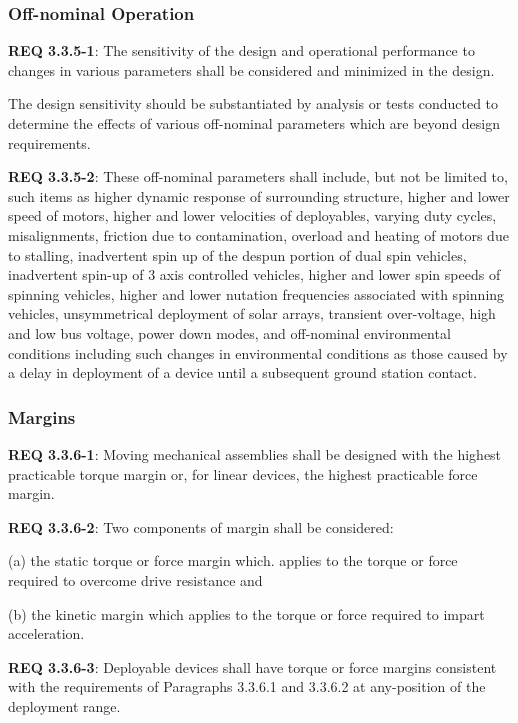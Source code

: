 \documentclass[12pt]{article}
\begin{document}
\subsubsection{Off-nominal Operation} %
\noindent \textbf{REQ 3.3.5-1}: The sensitivity of the design and operational performance to changes in various parameters shall be considered and minimized in the design. 

The design sensitivity should be substantiated by analysis or tests conducted to determine the effects of various off-nominal parameters which are beyond design requirements. 

\noindent \textbf{REQ 3.3.5-2}: These off-nominal parameters shall include, but not be limited to, such items as higher dynamic response of surrounding structure, higher and lower speed of motors, higher and lower velocities of deployables, varying duty cycles, misalignments, friction due to contamination, overload and heating of motors due to stalling, inadvertent spin up of the despun portion of dual spin vehicles, inadvertent spin-up of 3 axis controlled vehicles, higher and lower spin speeds of spinning vehicles, higher and lower nutation frequencies associated with spinning vehicles, unsymmetrical deployment of solar arrays, transient over-voltage, high and low bus voltage, power down modes, and off-nominal environmental conditions including such changes in environmental conditions as those caused by a delay in deployment of a device until a subsequent ground station contact.


\subsubsection{Margins} %
\noindent \textbf{REQ 3.3.6-1}: Moving mechanical assemblies shall be designed with the highest practicable torque margin or, for linear devices, the highest practicable force margin. 

\noindent \textbf{REQ 3.3.6-2}: Two components of margin shall be considered: 

(a) the static torque or force margin which. applies to the torque or force required to overcome drive resistance and 

(b) the kinetic margin which applies to the torque or force required to impart acceleration.

\noindent \textbf{REQ 3.3.6-3}: Deployable devices shall have torque or force margins consistent with the requirements of Paragraphs 3.3.6.1 and 3.3.6.2 at any-position of the deployment range. 
\end{document}
